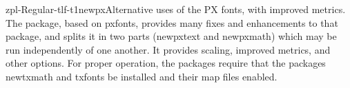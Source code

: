 \documentclass{ddltxtyp}
\begin{document}

\begin{package}{zpl-Regular-tlf-t1}{newpx}{Alternative uses of the PX fonts, with improved metrics.}
The package, based on pxfonts, provides many fixes and
enhancements to that package, and splits it in two parts
(newpxtext and newpxmath) which may be run independently of one
another. It provides scaling, improved metrics, and other
options. For proper operation, the packages require that the
packages newtxmath and txfonts be installed and their map files
enabled.
\end{package}
\end{document}
